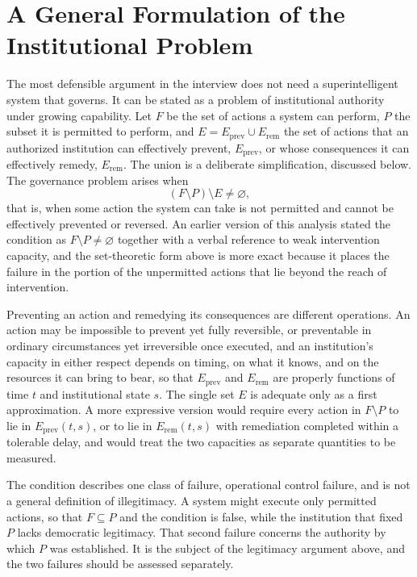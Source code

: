 \documentclass[11pt]{article}
\begin{document}
\section{A General Formulation of the Institutional Problem}\label{sec:formal}

The most defensible argument in the interview does not need a superintelligent system that governs. It can be stated as a problem of institutional authority under growing capability. Let $F$ be the set of actions a system can perform, $P$ the subset it is permitted to perform, and $E=E_{\mathrm{prev}}\cup E_{\mathrm{rem}}$ the set of actions that an authorized institution can effectively prevent, $E_{\mathrm{prev}}$, or whose consequences it can effectively remedy, $E_{\mathrm{rem}}$. The union is a deliberate simplification, discussed below. The governance problem arises when
\[
(F\setminus P)\setminus E \neq \varnothing,
\]
that is, when some action the system can take is not permitted and cannot be effectively prevented or reversed. An earlier version of this analysis stated the condition as $F\setminus P\neq\varnothing$ together with a verbal reference to weak intervention capacity, and the set-theoretic form above is more exact because it places the failure in the portion of the unpermitted actions that lie beyond the reach of intervention.

Preventing an action and remedying its consequences are different operations. An action may be impossible to prevent yet fully reversible, or preventable in ordinary circumstances yet irreversible once executed, and an institution's capacity in either respect depends on timing, on what it knows, and on the resources it can bring to bear, so that $E_{\mathrm{prev}}$ and $E_{\mathrm{rem}}$ are properly functions of time $t$ and institutional state $s$. The single set $E$ is adequate only as a first approximation. A more expressive version would require every action in $F\setminus P$ to lie in $E_{\mathrm{prev}}(t,s)$, or to lie in $E_{\mathrm{rem}}(t,s)$ with remediation completed within a tolerable delay, and would treat the two capacities as separate quantities to be measured.

The condition describes one class of failure, operational control failure, and is not a general definition of illegitimacy. A system might execute only permitted actions, so that $F\subseteq P$ and the condition is false, while the institution that fixed $P$ lacks democratic legitimacy. That second failure concerns the authority by which $P$ was established. It is the subject of the legitimacy argument above, and the two failures should be assessed separately.
\end{document}
